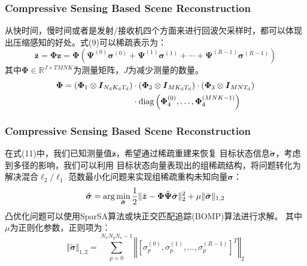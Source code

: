 \documentclass[cjk]{beamer}
\begin{document}
  \begin{frame}
	\frametitle{Compressive Sensing Based Scene Reconstruction}
	从快时间，慢时间或者是发射/接收机四个方面来进行回波欠采样时，都可以体现
	出压缩感知的好处。式(9)可以稀疏表示为：
	\begin{equation}
	  \bar{\boldsymbol z}={\boldsymbol{\Phi z}}={\boldsymbol\Phi}\left({\boldsymbol\Psi}^{(0)}{\boldsymbol\sigma}^{(0)}+{\boldsymbol\Psi}^{(1)}{\boldsymbol\sigma}^{(1)}+\cdots+{\boldsymbol\Psi}^{(R-1)}{\boldsymbol\sigma}^{(R-1)}\right)
	\end{equation}
	其中${\boldsymbol\Phi}\in\mathbb{R}^{J\times TMNK}$为测量矩阵，$J$为减少测量的数量。
	\begin{equation*}
	  \begin{split}
	  {\boldsymbol\Phi}=\left({\boldsymbol\Phi}_{1}\otimes{\boldsymbol I}_{N_{\rm d}K_{\rm d}T_{\rm d}}\right)&\cdot\left({\boldsymbol\Phi}_{2}\otimes{\boldsymbol I}_{MK_{\rm d}T_{\rm d}}\right)\cdot\left({\boldsymbol\Phi}_{3}\otimes{\boldsymbol I}_{MNT_{\rm d}}\right)\\
	  &\cdot{\rm diag}\left({\boldsymbol\Phi}_{4}^{(0)},\ldots,{\boldsymbol\Phi}_{4}^{(MNK-1)}\right)
	  \end{split}
	\end{equation*}
  \end{frame}
  \begin{frame}
	\frametitle{Compressive Sensing Based Scene Reconstruction}
	在式(11)中，我们已知测量值$\bar{\boldsymbol z}$，希望通过稀疏重建来恢复
	目标状态信息$\tilde{\boldsymbol\sigma}$，考虑到多径的影响，我们可以利用
	目标状态向量表现出的组稀疏结构，将问题转化为解决混合$\ell_{2}/\ell_{1}$
	范数最小化问题来实现组稀疏重构未知向量${\boldsymbol\sigma}$：
	\begin{equation}
	 \hat{\boldsymbol\sigma}=\arg\min_{\tilde{\boldsymbol\sigma}}{1\over 2}\Vert\bar{\boldsymbol z}-{\boldsymbol\Phi}\tilde{\boldsymbol\Psi}\tilde{\boldsymbol\sigma}\Vert_{2}^{2}+\mu\Vert\tilde{\boldsymbol\sigma}\Vert_{1, 2} 
	\end{equation}
  凸优化问题可以使用SparSA算法或块正交匹配追踪(BOMP)算法进行求解。
	其中$\mu$为正则化参数，正则项为：
	\begin{equation*}
	 \Vert\tilde{\boldsymbol\sigma}\Vert_{1, 2}=\sum_{p=0}^{N_{x}N_{y}N_{v}-1}\left\Vert\left[\sigma_{p}^{(0)},\sigma_{p}^{(1)},\ldots,\sigma_{p}^{(R-1)}\right]^{T}\right\Vert_{2} 
	\end{equation*}
  \end{frame}
\end{document}
